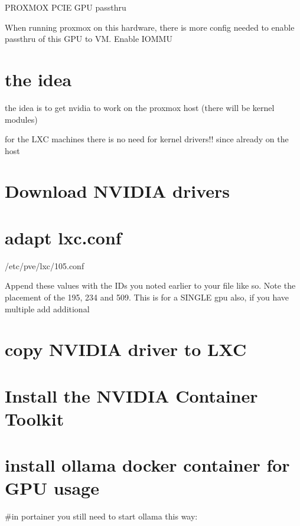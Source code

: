 \documentclass[letterpaper,10pt,english]{sphinxmanual}
\begin{document}
\sphinxAtStartPar
PROXMOX PCI\sphinxhyphen{}E GPU passthru

\sphinxAtStartPar
When running proxmox on this hardware, there is more config needed to enable passthru of this GPU to VM.
Enable IOMMU


\section{the idea}
\label{\detokenize{NVIDIA:the-idea}}
\sphinxAtStartPar
the idea is to get nvidia to work on the proxmox host (there will be kernel modules)

\sphinxAtStartPar
for the LXC machines there is no need for kernel drivers!! since already on the host


\section{Download NVIDIA drivers}
\label{\detokenize{NVIDIA:download-nvidia-drivers}}

\section{adapt lxc.conf}
\label{\detokenize{NVIDIA:adapt-lxc-conf}}
\sphinxAtStartPar
/etc/pve/lxc/105.conf

\sphinxAtStartPar
Append these values with the IDs you noted earlier to your file like so. Note the placement of the 195, 234 and 509. This is for a SINGLE gpu also, if you have multiple add additional


\section{copy NVIDIA driver to LXC}
\label{\detokenize{NVIDIA:copy-nvidia-driver-to-lxc}}

\section{Install the NVIDIA Container Toolkit}
\label{\detokenize{NVIDIA:install-the-nvidia-container-toolkit}}

\section{install ollama docker container for GPU usage}
\label{\detokenize{NVIDIA:install-ollama-docker-container-for-gpu-usage}}
\sphinxAtStartPar
\#in portainer you still need to start ollama this way:
\end{document}
